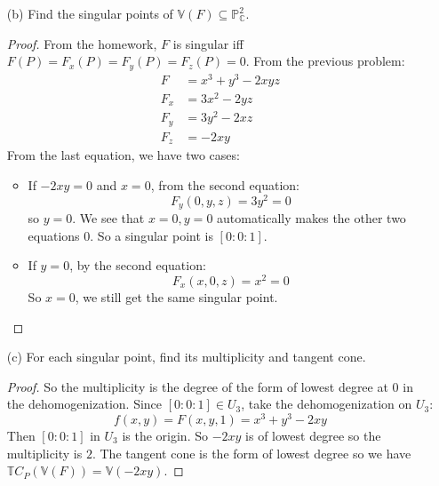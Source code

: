 \documentclass{article}
\begin{document}
\begin{itemize}
        \item [(b)] Find the singular points of $\mathbb{V}(F) \subseteq\mathbb{P}^{2}_{\mathbb{C}}$. 
            \begin{proof}
                From the homework, $F$ is singular iff $F(P) = F_{x}(P) = F_{y}(P) = F_{z}(P) = 0$. From the previous problem:
                    \begin{align*}
                        F     &= x^{3} + y^{3} - 2xyz \\
                        F_{x} &= 3x^{2} - 2yz         \\
                        F_{y} &= 3y^{2} - 2xz         \\
                        F_{z} &= -2xy                   
                    \end{align*}
                From the last equation, we have two cases:
                    \begin{itemize}
                        \item If $-2xy = 0$ and $x = 0$, from the second equation:
                            \begin{equation*}
                                F_{y}(0, y, z) = 3y^{2} = 0
                            \end{equation*}
                        so $y = 0$. We see that $x = 0, y = 0$ automatically makes the other two equations $0$. So a singular point is $[0 : 0 : 1]$.

                        \item If $y = 0$, by the second equation:
                            \begin{equation*}
                                F_{x}(x, 0, z) = x^{2} = 0
                            \end{equation*}
                        So $x = 0$, we still get the same singular point.
                    \end{itemize}
            \end{proof}

        \item [(c)] For each singular point, find its multiplicity and tangent cone. 
            \begin{proof}
                So the multiplicity is the degree of the form of lowest degree at $0$ in the dehomogenization. Since $[0 : 0 : 1] \in U_{3}$, take the dehomogenization on $U_{3}$:
                    \begin{equation*}
                        f(x, y) = F(x, y, 1) = x^{3} + y^{3} - 2xy
                    \end{equation*}
                Then $[0 : 0 : 1]$ in $U_{3}$ is the origin. So $-2xy$ is of lowest degree so the multiplicity is $2$. The tangent cone is the form of lowest degree so we have $\mathbb{T}C_{P}(\mathbb{V}(F)) = \mathbb{V}(-2xy)$.
            \end{proof}
    \end{itemize}
\end{document}
